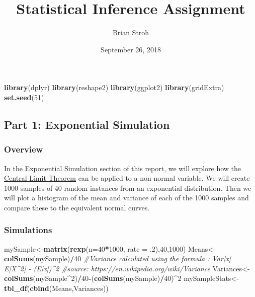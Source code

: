 \documentclass[]{article}
\title{Statistical Inference Assignment}
\author{Brian Stroh}
\date{September 26, 2018}
\newenvironment{Shaded}{\begin{snugshade}}{\end{snugshade}}
\newcommand{\KeywordTok}[1]{\textcolor[rgb]{0.13,0.29,0.53}{\textbf{#1}}}
\newcommand{\DataTypeTok}[1]{\textcolor[rgb]{0.13,0.29,0.53}{#1}}
\newcommand{\DecValTok}[1]{\textcolor[rgb]{0.00,0.00,0.81}{#1}}
\newcommand{\CommentTok}[1]{\textcolor[rgb]{0.56,0.35,0.01}{\textit{#1}}}
\newcommand{\OperatorTok}[1]{\textcolor[rgb]{0.81,0.36,0.00}{\textbf{#1}}}
\newcommand{\NormalTok}[1]{#1}
\begin{document}
\maketitle

\begin{Shaded}
\begin{Highlighting}[]
\KeywordTok{library}\NormalTok{(dplyr)}
\KeywordTok{library}\NormalTok{(reshape2)}
\KeywordTok{library}\NormalTok{(ggplot2)}
\KeywordTok{library}\NormalTok{(gridExtra)}
\KeywordTok{set.seed}\NormalTok{(}\DecValTok{51}\NormalTok{)}
\end{Highlighting}
\end{Shaded}

\subsection{Part 1: Exponential
Simulation}\label{part-1-exponential-simulation}

\subsubsection{Overview}\label{overview}

In the Exponential Simulation section of this report, we will explore
how the
\href{https://en.wikipedia.org/wiki/Central_limit_theorem}{Central Limit
Theorem} can be applied to a non-normal variable. We will create 1000
samples of 40 random instances from an exponential distribution. Then we
will plot a histogram of the mean and variance of each of the 1000
samples and compare these to the equivalent normal curves.

\subsubsection{Simulations}\label{simulations}

\begin{Shaded}
\begin{Highlighting}[]
\NormalTok{mySample<-}\KeywordTok{matrix}\NormalTok{(}\KeywordTok{rexp}\NormalTok{(}\DataTypeTok{n=}\DecValTok{40}\OperatorTok{*}\DecValTok{1000}\NormalTok{, }\DataTypeTok{rate =}\NormalTok{ .}\DecValTok{2}\NormalTok{),}\DecValTok{40}\NormalTok{,}\DecValTok{1000}\NormalTok{)}
\NormalTok{Means<-}\KeywordTok{colSums}\NormalTok{(mySample)}\OperatorTok{/}\DecValTok{40} 
\CommentTok{#Variance calculated using the formula : Var[x] = E[X^2] - (E[x])^2     }
\CommentTok{#source: https://en.wikipedia.org/wiki/Variance}
\NormalTok{Variances<-}\KeywordTok{colSums}\NormalTok{(mySample}\OperatorTok{^}\DecValTok{2}\NormalTok{)}\OperatorTok{/}\DecValTok{40}\OperatorTok{-}\NormalTok{(}\KeywordTok{colSums}\NormalTok{(mySample)}\OperatorTok{/}\DecValTok{40}\NormalTok{)}\OperatorTok{^}\DecValTok{2}
\NormalTok{mySampleStats<-}\KeywordTok{tbl_df}\NormalTok{(}\KeywordTok{cbind}\NormalTok{(Means,Variances))}
\end{Highlighting}
\end{Shaded}
\end{document}
